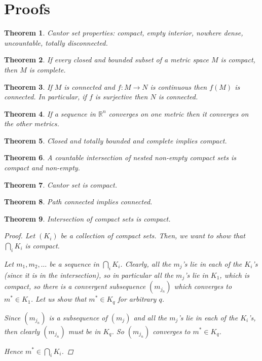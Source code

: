 \documentclass[11pt]{article}
\newcommand{\bbR}{\mathbb{R}}
\renewcommand{\_}[1]{\underline{ #1 }}
\newtheorem{theorem}{Theorem}[section]
\theoremstyle{definition}
\numberwithin{equation}{subsection}
\begin{document}
\bigskip

\section*{Proofs}

\begin{theorem}
    Cantor set properties: compact, empty interior, nowhere dense, uncountable, totally disconnected.
\end{theorem}

\begin{theorem}
    If every closed and bounded subset of a metric space $M$ is compact, then $M$ is complete.
\end{theorem}

\begin{theorem}
    If $M$ is connected and $f : M \to N$ is continuous then $f(M)$ is connected. In particular, if $f$ is surjective then $N$ is connected. 
\end{theorem}

\begin{theorem}
    If a sequence in $\bbR^n$ converges on one metric then it converges on the other metrics.  
\end{theorem}

\begin{theorem}
    Closed and totally bounded and complete implies compact.
\end{theorem}

\begin{theorem}
A countable intersection of nested non-empty compact sets is compact and non-empty.
\end{theorem}

\begin{theorem}
    Cantor set is compact.
\end{theorem}

\begin{theorem}
    Path connected implies connected.
\end{theorem}

\begin{theorem}
    Intersection of compact sets is compact.
    \begin{proof}
        Let $(K_i)$ be a collection of compact sets. Then, we want to show that $\bigcap_i K_i$ is compact.

        Let $m_1, m_2, \dots$ be a sequence in $\bigcap_i K_i$. Clearly, all the $m_j$'s lie in each of the $K_i$'s (since it is in the intersection), so in particular all the $m_j$'s lie in $K_1$, which is compact, so there is a convergent subsequence $(m_{j_n})$ which converges to $m^* \in K_1$. Let us show that $m^* \in K_q$ for arbitrary $q$.

        Since $(m_{j_n})$ is a subsequence of $(m_j)$ and all the $m_j$'s lie in each of the $K_i$'s, then clearly $(m_{j_n})$ must be in $K_q$. So $(m_{j_n})$ converges to $m^* \in K_q$. 

        Hence $m^*\in \bigcap_i K_i$.
    \end{proof}
\end{theorem}
\end{document}
